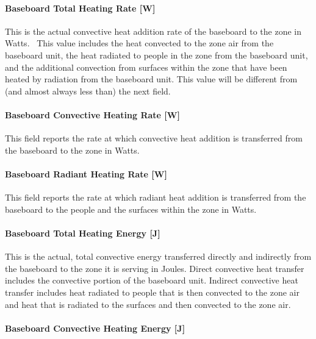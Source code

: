 \paragraph{Baseboard Total Heating Rate {[}W{]}}\label{baseboard-total-heating-rate-w-1}

This is the actual convective heat addition rate of the baseboard to the zone in Watts.~ This value includes the heat convected to the zone air from the baseboard unit, the heat radiated to people in the zone from the baseboard unit, and the additional convection from surfaces within the zone that have been heated by radiation from the baseboard unit. This value will be different from (and almost always less than) the next field.

\paragraph{Baseboard Convective Heating Rate {[}W{]}}\label{baseboard-convective-heating-rate-w-1}

This field reports the rate at which convective heat addition is transferred from the baseboard to the zone in Watts.

\paragraph{Baseboard Radiant Heating Rate {[}W{]}}\label{baseboard-radiant-heating-rate-w-1}

This field reports the rate at which radiant heat addition is transferred from the baseboard to the people and the surfaces within the zone in Watts.

\paragraph{Baseboard Total Heating Energy {[}J{]}}\label{baseboard-total-heating-energy-j-1}

This is the actual, total convective energy transferred directly and indirectly from the baseboard to the zone it is serving in Joules. Direct convective heat transfer includes the convective portion of the baseboard unit. Indirect convective heat transfer includes heat radiated to people that is then convected to the zone air and heat that is radiated to the surfaces and then convected to the zone air.

\paragraph{Baseboard Convective Heating Energy {[}J{]}}\label{baseboard-convective-heating-energy-j-1}

